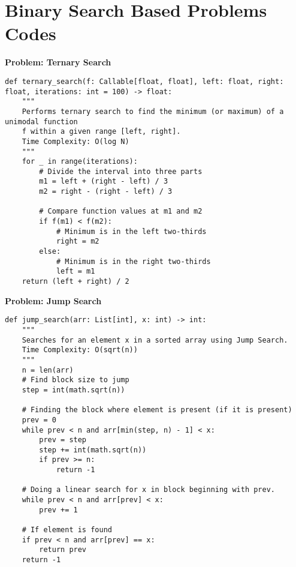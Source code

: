 % 
% 
\section*{Binary Search Based Problems Codes}

\noindent\textbf{Problem: Ternary Search}
\begin{verbatim}
def ternary_search(f: Callable[float, float], left: float, right: float, iterations: int = 100) -> float:
    """
    Performs ternary search to find the minimum (or maximum) of a unimodal function
    f within a given range [left, right].
    Time Complexity: O(log N)
    """
    for _ in range(iterations):
        # Divide the interval into three parts
        m1 = left + (right - left) / 3
        m2 = right - (right - left) / 3

        # Compare function values at m1 and m2
        if f(m1) < f(m2):
            # Minimum is in the left two-thirds
            right = m2
        else:
            # Minimum is in the right two-thirds
            left = m1
    return (left + right) / 2
\end{verbatim}

\noindent\textbf{Problem: Jump Search}
\begin{verbatim}
def jump_search(arr: List[int], x: int) -> int:
    """
    Searches for an element x in a sorted array using Jump Search.
    Time Complexity: O(sqrt(n))
    """
    n = len(arr)
    # Find block size to jump
    step = int(math.sqrt(n))

    # Finding the block where element is present (if it is present)
    prev = 0
    while prev < n and arr[min(step, n) - 1] < x:
        prev = step
        step += int(math.sqrt(n))
        if prev >= n:
            return -1

    # Doing a linear search for x in block beginning with prev.
    while prev < n and arr[prev] < x:
        prev += 1

    # If element is found
    if prev < n and arr[prev] == x:
        return prev
    return -1
\end{verbatim}

